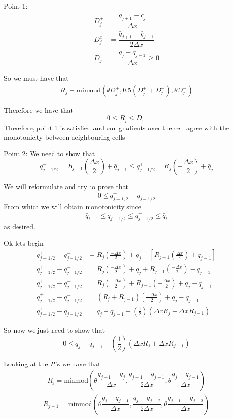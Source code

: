 \documentclass[10pt]{article}
\begin{document}
Point 1:
\begin{align}
D^+_j &= \dfrac{\bar{q}_{j+1} - \bar{q}_{j}}{\Delta x} \\
D^c_j &= \dfrac{\bar{q}_{j+1} - \bar{q}_{j-1}}{2\Delta x} \\
D^-_j &= \dfrac{\bar{q}_{j} - \bar{q}_{j-1}}{\Delta x}  \ge 0
\end{align}

So we must have that
\begin{align}
R_j = \text{minmod}\left( \theta D^+_j,0.5\left(D^+_j + D^-_j\right),\theta D^-_j\right)
\end{align} 

Therefore we have that 
\[ 0 \le R_j \le D^-_j\]
Therefore, point 1 is satisfied and our gradients over the cell agree with the monotonicity between neighbouring cells

Point 2:
We need to show that 
\[q^{-}_{j-1/2} = R_{j-1}\left(\frac{\Delta x}{2} \right) + \bar{q}_{j-1} \le q^{+}_{j-1/2} = R_{j}\left(-\frac{\Delta x}{2} \right) + \bar{q}_{j} \]

We will reformulate and try to prove that
\[0 \le q^{+}_{j-1/2} - q^{-}_{j-1/2} \]
From which we will obtain monotonicity since
\[\bar{q}_{i-1} \le q^{-}_{j-1/2}  \le q^{+}_{j-1/2}  \le \bar{q}_{i}\]
as desired. 

Ok lets begin
\begin{align}
q^{+}_{j-1/2} - q^{-}_{j-1/2} &= R_j\left(\frac{-\Delta x}{2}\right) + q_{j} - \left[R_{j-1}\left(\frac{\Delta x}{2}\right) + q_{j-1}\right] \\
q^{+}_{j-1/2} - q^{-}_{j-1/2} &= R_j\left(\frac{-\Delta x}{2}\right) + q_{j} + R_{j-1}\left(\frac{-\Delta x}{2}\right) - q_{j-1} \\
q^{+}_{j-1/2} - q^{-}_{j-1/2} &= R_j\left(\frac{-\Delta x}{2}\right) + R_{j-1}\left(-\frac{\Delta x}{2}\right) + q_{j} - q_{j-1} \\
q^{+}_{j-1/2} - q^{-}_{j-1/2} &= \left(R_j +R_{j-1}\right) \left(\frac{-\Delta x}{2}\right) + q_{j} - q_{j-1}\\
q^{+}_{j-1/2} - q^{-}_{j-1/2} &=  q_{j} - q_{j-1} - \left(\frac{1}{2}\right)\left(\Delta x  R_j + \Delta x R_{j-1}\right)
\end{align}

So now we just need to show that
\[0 \le q_{j} - q_{j-1} - \left(\frac{1}{2}\right)\left(\Delta x  R_j + \Delta x R_{j-1}\right) \]

Looking at the $R$'s we have that
\begin{align}
R_j = \text{minmod}\left( \theta \dfrac{\bar{q}_{j+1} - \bar{q}_{j}}{\Delta x},\dfrac{\bar{q}_{j+1} - \bar{q}_{j-1}}{2\Delta x},\theta\dfrac{\bar{q}_{j} - \bar{q}_{j-1}}{\Delta x} \right) 
\end{align} 
\begin{align}
R_{j-1} = \text{minmod}\left( \theta\dfrac{\bar{q}_{j} - \bar{q}_{j-1}}{\Delta x},\dfrac{\bar{q}_{j} - \bar{q}_{j-2}}{2\Delta x},\theta\dfrac{\bar{q}_{j-1} - \bar{q}_{j-2}}{\Delta x} \right) 
\end{align} 
\end{document}
